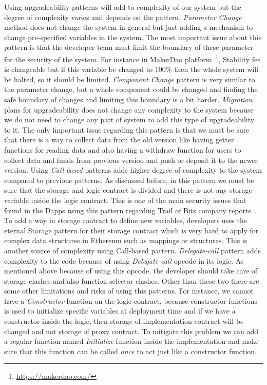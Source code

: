  Using upgradeability patterns will add to complexity of our system but the degree of complexity varies and depends on the pattern. 
\textit{Parameter Change} method does not change the system in general but just adding a mechanism to change pre-specified variables in the system. The most important issue about this pattern is that the developer team must limit the boundary of these parameter for the security of the system. For instance in MakerDao platform~\footnote{\url{https://makerdao.com/}}, Stability fee is changeable but if this variable be changed to 100\% then the whole system will be halted, so it should be limited.
\textit{Component Change} pattern is very similar to the parameter change, but a whole component could be changed and finding the safe boundary of changes and limiting this boundary is a bit harder.
\textit{Migration} plans for upgradeability does not change any complexity to the system because we do not need to change any part of system to add this type of upgradeability to it. The only important issue regarding this pattern is that we must be sure that there is a way to collect data from the old version like having getter functions for reading data and also having a withdraw function for users to collect data and funds from previous version and push or deposit it to the newer version.
Using \textit{Call-based} patterns adds higher degree of complexity to the system compared to previous patterns. As discussed before, in this pattern we must be sure that the storage and logic contract is divided and there is not any storage variable inside the logic contract. This is one of the main security issues that found in the Dapps using this pattern regarding Trail of Bits company reports~\cite{tobBlogPost}. To add a way in storage contract to define new variables, developers uses the eternal Storage pattern for their storage contract which is very hard to apply for complex data structures in Ethereum such as mappings or structures. This is another source of complexity using Call-based pattern.
\textit{Delegate-call} pattern adds complexity to the code because of using \textit{Delegate-call} opcode in its logic. As mentioned above because of using this opcode, the developer should take care of storage clashes and also function selector clashes. Other than these two there are some other limitations and risks of using this patterns. For instance, we cannot have a \textit{Constructor} function on the logic contract, because constructor functions is used to initialize specific variables at deployment time and if we have a constructor inside the logic, then storage of implementation contract will be changed and not storage of proxy contract. To mitigate this problem we can add a regular function named \textit{Initialize} function inside the implementation and make sure that this function can be called \emph{once} to act just like a constructor function. 
